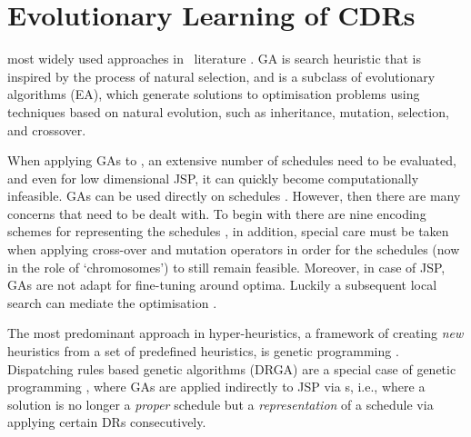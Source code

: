

\chapter{Evolutionary Learning of CDRs}\label{ch:esmodels} 

 most widely used 
approaches in \JSP\ literature \citep{Pinedo08}. 
GA is search heuristic that is inspired by the process of natural selection, 
and is a subclass of evolutionary algorithms (EA), which generate solutions to 
optimisation problems using techniques based on natural evolution, such as 
inheritance, mutation, selection, and crossover.

When applying GAs to \JSP, an extensive number of schedules need to be 
evaluated, and even for low dimensional JSP, it can quickly become 
computationally infeasible. GAs can be used directly on schedules 
\citep{Cheng96,Cheng99,Tsai07,Qing-dao-er-ji12,Ak12}. 
However, then there are many concerns that need to be dealt with. 
To begin with there are nine encoding schemes for representing the schedules 
\citep{Cheng96}, in addition, special care must be taken when applying 
cross-over and mutation operators in order for the schedules (now in the role 
of `chromosomes') to still remain feasible. 
Moreover, in case of JSP, GAs are not adapt for fine-tuning around optima. 
Luckily a subsequent local search can mediate the optimisation 
\citep{Cheng99,Meeran12}.

The most predominant approach in hyper-heuristics, a framework of creating 
\emph{new} heuristics from a set of  predefined heuristics, is genetic 
programming \citep{Burke10}. Dispatching rules based genetic algorithms (DRGA) 
\citep{Vazquez-Rodriguez09,Dhingra10,Nguyen13} are a special case of genetic 
programming \citep{Koza05}, where GAs are applied indirectly to JSP via 
\dr s, i.e., where a solution is no longer a \emph{proper} schedule 
but a \emph{representation} of a schedule via applying certain DRs 
consecutively. 


